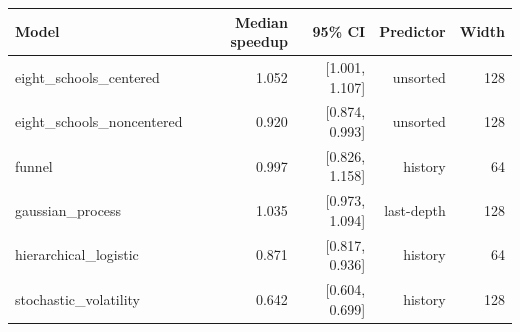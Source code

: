 \begin{tabular}{lrrrr}
\toprule
Model & Median speedup & 95\% CI & Predictor & Width \\
\midrule
eight\_schools\_centered & 1.052 & [1.001, 1.107] & unsorted & 128 \\
eight\_schools\_noncentered & 0.920 & [0.874, 0.993] & unsorted & 128 \\
funnel & 0.997 & [0.826, 1.158] & history & 64 \\
gaussian\_process & 1.035 & [0.973, 1.094] & last-depth & 128 \\
hierarchical\_logistic & 0.871 & [0.817, 0.936] & history & 64 \\
stochastic\_volatility & 0.642 & [0.604, 0.699] & history & 128 \\
\bottomrule
\end{tabular}
